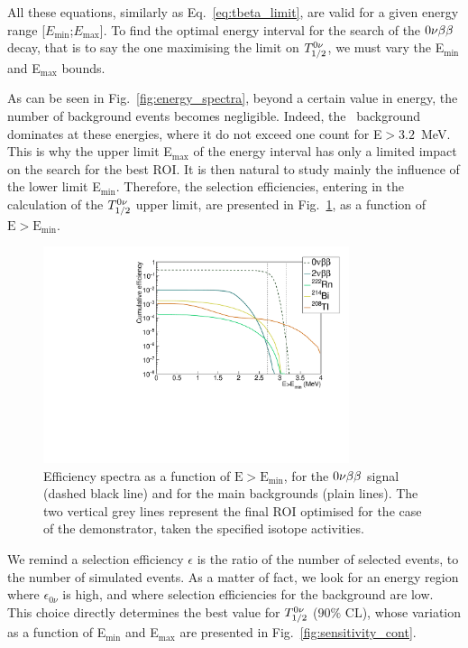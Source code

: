 All these equations, similarly as Eq.~\eqref{eq:tbeta_limit}, are valid for a given energy range [$E_{\text{min}}$;$E_{\text{max}}$].
To find the optimal energy interval for the search of the $0\nu\beta\beta$ decay, that is to say the one maximising the limit on $T_{1/2}^{0\nu}$, we must vary the E$_{\text{min}}$ and E$_{\text{max}}$ bounds.

As can be seen in Fig.~\ref{fig:energy_spectra}, beyond a certain value in energy, the number of background events becomes negligible.
Indeed, the \Tl\ background dominates at these energies, where it do not exceed one count for E$>3.2$~MeV.
This is why the upper limit E$_{\text{max}}$ of the energy interval has only a limited impact on the search for the best ROI.
It is then natural to study mainly the influence of the lower limit E$_{\text{min}}$.
Therefore, the selection efficiencies, entering in the calculation of the $T_{1/2}^{0\nu}$ upper limit, are presented in Fig.~\ref{fig:efficiency_spectra}, as a function of $\text{E}>\text{E}_{\text{min}}$.
\begin{figure}[h]
  \centering
  \includegraphics[width=0.8\textwidth]{Sensitivity/fig_sensitivity/efficiency_spectrum_with_B_82Se.pdf}
  \caption{Efficiency spectra as a function of $\text{E}>\text{E}_{\text{min}}$, for the $0\nu\beta\beta$ signal (dashed black line) and for the main backgrounds (plain lines).
    The two vertical grey lines represent the final ROI optimised for the case of the demonstrator, taken the specified isotope activities.
    \label{fig:efficiency_spectra}}
\end{figure}
We remind a selection efficiency $\epsilon$ is the ratio of the number of selected events, to the number of simulated events.
As a matter of fact, we look for an energy region where $\epsilon_{0\nu}$ is high, and where selection efficiencies for the background are low.
This choice directly determines the best value for $T_{1/2}^{0\nu}$ ($90\%$ CL), whose variation as a function of E$_{\text{min}}$ and E$_{\text{max}}$ are presented in Fig.~\ref{fig:sensitivity_cont}.
